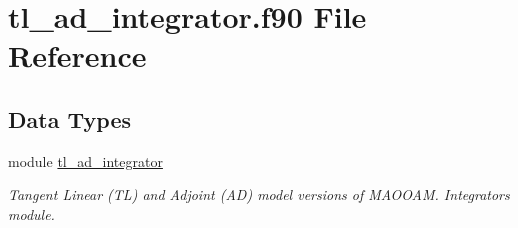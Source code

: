 \hypertarget{tl__ad__integrator_8f90}{\section{tl\-\_\-ad\-\_\-integrator.\-f90 File Reference}
\label{tl__ad__integrator_8f90}
}
\subsection*{Data Types}
\begin{DoxyCompactItemize}
\item 
module \hyperlink{classtl__ad__integrator}{tl\-\_\-ad\-\_\-integrator}
\begin{DoxyCompactList}\small\item\em Tangent Linear (T\-L) and Adjoint (A\-D) model versions of M\-A\-O\-O\-A\-M. Integrators module. \end{DoxyCompactList}\end{DoxyCompactItemize}

